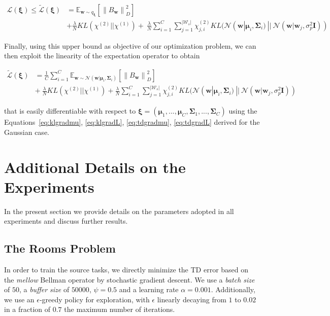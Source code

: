 \documentclass{article}
\newcommand{\norm}[1]{\left\lVert #1 \right\rVert}
\begin{document}
\begin{align}
\mathcal{L}(\bm{\xi}) \leq  \widetilde{\mathcal{L}}(\bm{\xi}) &= \mathbb{E}_{\bm{w} \sim q_{\bm{\xi}}}\left[\norm{B_{\bm{w}}}_D^2\right] \nonumber \\&+ \frac{\lambda}{N} KL(\chi^{(2)}||\chi^{(1)}) +\  \frac{\lambda}{N}\sum_{i=1}^C\sum_{j=1}^{|\mathcal{W}_s|} \chi_{j,i}^{(2)}KL(\mathcal{N}(\bm{w}|\bm{\mu}_i, \bm{\Sigma}_i)\ ||\ \mathcal{N}(\bm{w}|\bm{w}_j, \sigma_p^2\bm{I}))
\end{align}

Finally, using this upper bound as objective of our optimization problem, we can then exploit the linearity of the expectation operator to obtain


\begin{align}
\widetilde{\mathcal{L}}(\bm{\xi}) &= \frac{1}{C}\sum_{i=1}^C \mathbb{E}_{\bm{w} \sim \mathcal{N}(\bm{w}|\bm{\mu}_i, \bm{\Sigma}_i)}\left[\norm{B_{\bm{w}}}_D^2\right] \nonumber \\ &+\ \frac{\lambda}{N}KL(\chi^{(2)}||\chi^{(1)}) + \frac{\lambda}{N}\sum_{i=1}^C\sum_{j=1}^{|\mathcal{W}_s|} \chi_{j,i}^{(2)} KL(\mathcal{N}(\bm{w}|\bm{\mu}_i, \bm{\Sigma}_i)\ ||\ \mathcal{N}(\bm{w}|\bm{w}_j, \sigma_p^2\bm{I}))
\end{align}


that is easily differentiable with respect to $\bm{\xi} = (\bm{\mu}_1,..., \bm{\mu}_C, \bm{\Sigma}_1,..., \bm{\Sigma}_C)$ using the Equations~\eqref{eq:klgradmu}, \eqref{eq:klgradL}, \eqref{eq:tdgradmu}, \eqref{eq:tdgradL} derived for the Gaussian case.

\section{Additional Details on the Experiments}

In the present section we provide details on the parameters adopted in all experiments and discuss further results.

\subsection{The Rooms Problem}

In order to train the source tasks, we directly minimize the TD error based on the \textit{mellow} Bellman operator by stochastic gradient descent. We use a \textit{batch size} of $50$, a \textit{buffer size} of $50000$, $\psi=0.5$ and a learning rate $\alpha=0.001$. Additionally, we use an $\epsilon$-greedy policy for exploration, with $\epsilon$ linearly decaying from $1$ to $0.02$ in a fraction of $0.7$ the maximum number of iterations.
\end{document}
